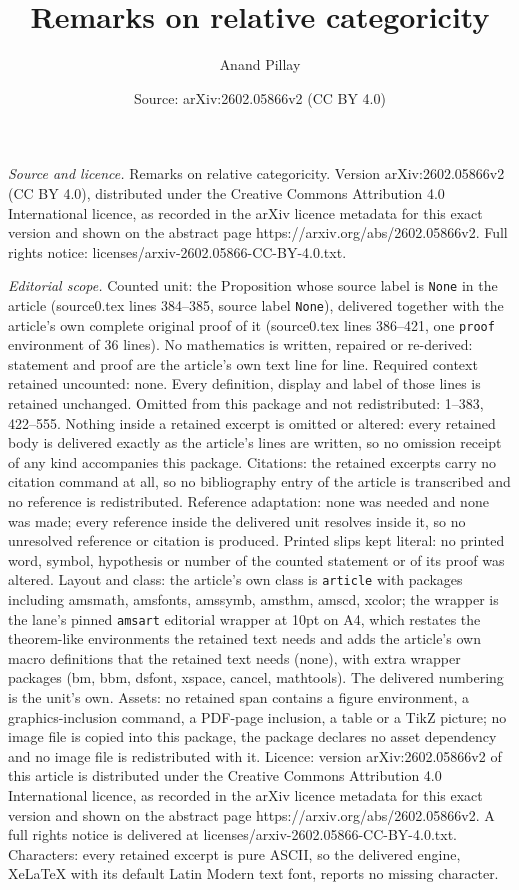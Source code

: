 \documentclass[10pt,a4paper]{amsart}
\title[Remarks on relative categoricity]{Remarks on relative categoricity}
\author{Anand Pillay}
\date{Source: arXiv:2602.05866v2 (CC BY 4.0)}
\begin{document}
\maketitle

\noindent\emph{Source and licence.} Remarks on relative categoricity. Version arXiv:2602.05866v2 (CC BY 4.0), distributed under the Creative Commons Attribution 4.0 International licence, as recorded in the arXiv licence metadata for this exact version and shown on the abstract page https://arxiv.org/abs/2602.05866v2. Full rights notice: licenses/arxiv-2602.05866-CC-BY-4.0.txt.\par\smallskip

\noindent\textit{Editorial scope.} Counted unit: the Proposition whose source label is \texttt{None} in the article (source0.tex lines 384--385, source label \texttt{None}), delivered together with the article's own complete original proof of it (source0.tex lines 386--421, one \texttt{proof} environment of 36 lines). No mathematics is written, repaired or re-derived: statement and proof are the article's own text line for line. Required context retained uncounted: none. Every definition, display and label of those lines is retained unchanged. Omitted from this package and not redistributed: 1--383, 422--555. Nothing inside a retained excerpt is omitted or altered: every retained body is delivered exactly as the article's lines are written, so no omission receipt of any kind accompanies this package. Citations: the retained excerpts carry no citation command at all, so no bibliography entry of the article is transcribed and no reference is redistributed. Reference adaptation: none was needed and none was made; every reference inside the delivered unit resolves inside it, so no unresolved reference or citation is produced. Printed slips kept literal: no printed word, symbol, hypothesis or number of the counted statement or of its proof was altered. Layout and class: the article's own class is \texttt{article} with packages including amsmath, amsfonts, amssymb, amsthm, amscd, xcolor; the wrapper is the lane's pinned \texttt{amsart} editorial wrapper at 10pt on A4, which restates the theorem-like environments the retained text needs and adds the article's own macro definitions that the retained text needs (none), with extra wrapper packages (bm, bbm, dsfont, xspace, cancel, mathtools). The delivered numbering is the unit's own. Assets: no retained span contains a figure environment, a graphics-inclusion command, a PDF-page inclusion, a table or a TikZ picture; no image file is copied into this package, the package declares no asset dependency and no image file is redistributed with it. Licence: version arXiv:2602.05866v2 of this article is distributed under the Creative Commons Attribution 4.0 International licence, as recorded in the arXiv licence metadata for this exact version and shown on the abstract page https://arxiv.org/abs/2602.05866v2. A full rights notice is delivered at licenses/arxiv-2602.05866-CC-BY-4.0.txt. Characters: every retained excerpt is pure ASCII, so the delivered engine, XeLaTeX with its default Latin Modern text font, reports no missing character.
\end{document}
